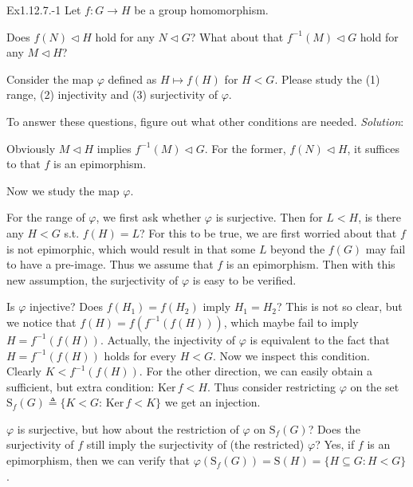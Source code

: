 \documentclass{article}
\newcommand{\nles}{\vartriangleleft}
\newcommand{\Ker}{\text{Ker}\,}
\begin{document}
\begin{Th}{Ex1.12.7.-1}
    Let $f: G\to H$ be a group homomorphism.
    \begin{compactenum}
        \item Does $f(N)\nles H$ hold for any $N\nles G$? What about that $f^{-1}(M) \nles G$ hold for any $M\nles H$?
        \item Consider the map $\varphi$ defined as $H\mapsto f(H)$ for $H<G$. Please study the (1) range, (2) injectivity and (3) surjectivity of $\varphi$.
    \end{compactenum}
    To answer these questions, figure out what other conditions are needed.
    \tcblower
    \textit{Solution}:
    \begin{compactenum}
        \item Obviously $M\nles H$ implies $f^{-1}(M) \nles G$. For the former, $f(N)\nles H$, it suffices to that $f$ is an epimorphism.
        \item Now we study the map $\varphi$.
        \begin{compactenum}
            \item For the range of $\varphi$, we first ask whether $\varphi$ is surjective. Then for $L<H$, is there any $H<G$ s.t. $f(H) = L$? For this to be true, we are first worried about that $f$ is not epimorphic, which would result in that some $L$ beyond the $f(G)$ may fail to have a pre-image. Thus we assume that \textcolor{P}{$f$ is an epimorphism}. Then with this new assumption, the surjectivity of $\varphi$ is easy to be verified.
            \item Is $\varphi$ injective? Does $f(H_1) = f(H_2)$ imply $H_1 = H_2$? This is not so clear, but we notice that $f(H) = f(f^{-1}(f(H)))$, which maybe fail to imply $H = f^{-1}(f(H))$. Actually, the injectivity of $\varphi$ is equivalent to the fact that $H = f^{-1}(f(H))$ holds for every $H < G$. Now we inspect this condition. Clearly $K<f^{-1}(f(H))$. For the other direction, we can easily obtain a sufficient, but extra condition: \textcolor{P}{$\Ker f<H$}. Thus consider restricting $\varphi$ on the set $\mathrm{S}_f(G)\triangleq \{K<G: \,\Ker f<K\}$ we get an injection. 
            \item $\varphi$ is surjective, but how about the restriction of $\varphi$ on $\mathrm{S}_f(G)$? Does the surjectivity of $f$ still imply the surjectivity of (the restricted) $\varphi$? Yes, if $f$ is an epimorphism, then we can verify that $\varphi(\mathrm{S}_f(G)) = \mathrm{S}(H) = \{H\subseteq G: H<G\}$.
        \end{compactenum}
    \end{compactenum}
\end{Th}
\end{document}
